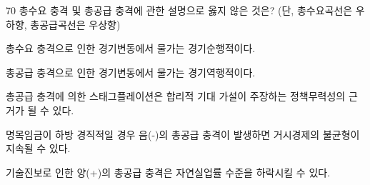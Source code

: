 \begin{question}{70}
총수요 충격 및 총공급 충격에 관한 설명으로 옳지 않은 것은? (단, 총수요곡선은 우하향, 총공급곡선은 우상향)
\begin{choices}
  \item 총수요 충격으로 인한 경기변동에서 물가는 경기순행적이다.
  \item 총공급 충격으로 인한 경기변동에서 물가는 경기역행적이다.
  \item 총공급 충격에 의한 스태그플레이션은 합리적 기대 가설이 주장하는 정책무력성의 근거가 될 수 있다.
  \item 명목임금이 하방 경직적일 경우 음(-)의 총공급 충격이 발생하면 거시경제의 불균형이 지속될 수 있다.
  \item 기술진보로 인한 양(+)의 총공급 충격은 자연실업률 수준을 하락시킬 수 있다.
\end{choices}
\end{question}

